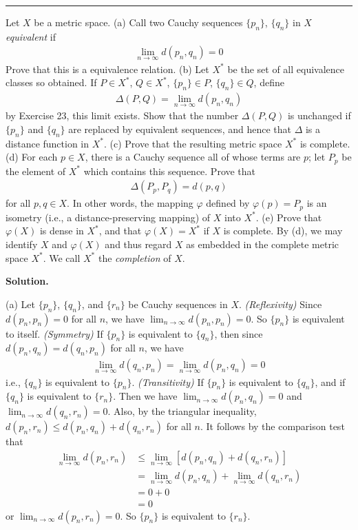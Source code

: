 \documentclass[12pt]{article}
\theoremstyle{definition}
\begin{document}
\bigskip\noindent\hrule\bigskip

Let $X$ be a metric space.
(a) Call two Cauchy sequences $\{p_n\}$, $\{q_n\}$ in $X$ \textit{equivalent} if
\begin{align*}
\lim_{n\to\infty}d(p_n,q_n)=0
\end{align*}
Prove that this is a equivalence relation.
(b) Let $X^\ast$ be the set of all equivalence classes so obtained. If $P\in X^\ast$, $Q\in X^\ast$, $\{p_n\}\in P$, $\{q_n\}\in Q$, define
\begin{align*}
\Delta(P,Q)=\lim_{n\to\infty}d(p_n,q_n)
\end{align*}
by Exercise 23, this limit exists. Show that the number $\Delta(P,Q)$ is unchanged if $\{p_n\}$ and $\{q_n\}$ are replaced by equivalent sequences, and hence that $\Delta$ is a distance function in $X^\ast$.
(c) Prove that the resulting metric space $X^\ast$ is complete.
(d) For each $p\in X$, there is a Cauchy sequence all of whose terms are $p$; let $P_p$ be the element of $X^\ast$ which contains this sequence. Prove that
\begin{align*}
\Delta(P_p,P_q)=d(p,q)
\end{align*}
for all $p,q\in X$. In other words, the mapping $\varphi$ defined by $\varphi(p)=P_p$ is an isometry (i.e., a distance-preserving mapping) of $X$ into $X^\ast$.
(e) Prove that $\varphi(X)$ is dense in $X^\ast$, and that $\varphi(X)=X^\ast$ if $X$ is complete. By (d), we may identify $X$ and $\varphi(X)$ and thus regard $X$ as embedded in the complete metric space $X^\ast$. We call $X^\ast$ the \textit{completion} of $X$.

\smallskip
\noindent\textbf{Solution.}\quad

(a) Let $\{p_n\}$, $\{q_n\}$, and $\{r_n\}$ be Cauchy sequences in $X$.
\textit{(Reflexivity)} Since $d(p_n,p_n)=0$ for all $n$, we have $\lim_{n\to\infty}d(p_n,p_n)=0$. So $\{p_n\}$ is equivalent to itself.
\textit{(Symmetry)} If $\{p_n\}$ is equivalent to $\{q_n\}$, then since $d(p_n,q_n)=d(q_n,p_n)$ for all $n$, we have
\begin{align*}
\lim_{n\to\infty}d(q_n,p_n)=\lim_{n\to\infty}d(p_n,q_n)=0
\end{align*}
i.e., $\{q_n\}$ is equivalent to $\{p_n\}$.
\textit{(Transitivity)} If $\{p_n\}$ is equivalent to $\{q_n\}$, and if $\{q_n\}$ is equivalent to $\{r_n\}$. Then we have $\lim_{n\to\infty}d(p_n,q_n)=0$ and $\lim_{n\to\infty}d(q_n,r_n)=0$. Also, by the triangular inequality, $d(p_n,r_n)\le d(p_n,q_n)+d(q_n,r_n)$ for all $n$. It follows by the comparison test that
\begin{align*}
\lim_{n\to\infty}d(p_n,r_n)
&\le\lim_{n\to\infty}\left[d(p_n,q_n)+d(q_n,r_n)\right] \\
&=\lim_{n\to\infty}d(p_n,q_n)+\lim_{n\to\infty}d(q_n,r_n) \\
&=0+0 \\
&=0
\end{align*}
or $\lim_{n\to\infty}d(p_n,r_n)=0$. So $\{p_n\}$ is equivalent to $\{r_n\}$.
\end{document}
